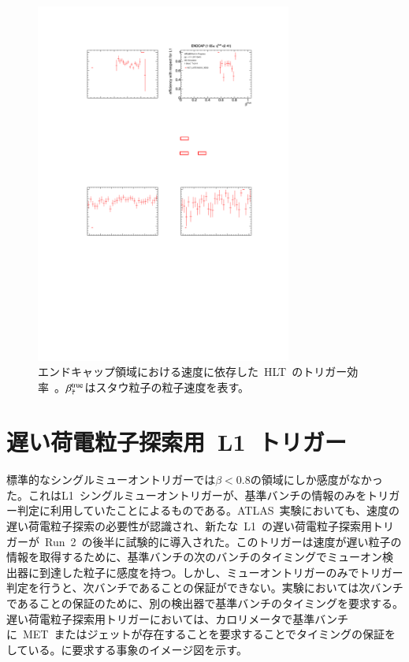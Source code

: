 \begin{figure}[tbp]
        \centering   
        \includegraphics[width=0.75\textwidth,page=1]{img/pdf3/hlt.pdf}
        \caption[エンドキャップ領域における速度に依存した HLT のトリガー効率]{エンドキャップ領域における速度に依存した~HLT~のトリガー効率~\cite{MT:01}。$\beta_{\Tilde{\tau}}^{\rm{true}}$はスタウ粒子の粒子速度を表す。}
        \label{fig:hlt}
\end{figure}

\section{遅い荷電粒子探索用~L1~トリガー}
\label{sec:latemu}
標準的なシングルミューオントリガーでは$\beta<0.8$の領域にしか感度がなかった。これはL1~シングルミューオントリガーが、基準バンチの情報のみをトリガー判定に利用していたことによるものである。ATLAS~実験においても、速度の遅い荷電粒子探索の必要性が認識され、新たな~L1~の遅い荷電粒子探索用トリガーが~Run~2~の後半に試験的に導入された。このトリガーは速度が遅い粒子の情報を取得するために、基準バンチの次のバンチのタイミングでミューオン検出器に到達した粒子に感度を持つ。しかし、ミューオントリガーのみでトリガー判定を行うと、次バンチであることの保証ができない。実験においては次バンチであることの保証のために、別の検出器で基準バンチのタイミングを要求する。遅い荷電粒子探索用トリガーにおいては、カロリメータで基準バンチに~MET~またはジェットが存在することを要求することでタイミングの保証をしている。に要求する事象のイメージ図を示す。

